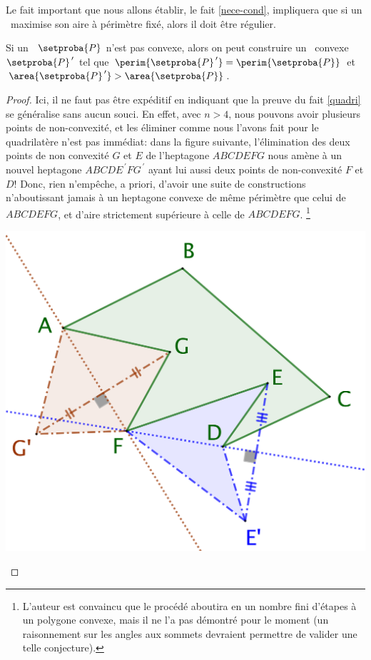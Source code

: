 Le fait important que nous allons établir, le fait \ref{nece-cond}, impliquera que si un \ngone\ maximise son aire à périmètre fixé, alors il doit être régulier.




\begin{fact} \label{conv-poly}
	Si un \ngone\ $\setproba{P}$ n'est pas convexe, alors on peut construire un \ngone\ convexe $\setproba{P}^{\,\prime}$ tel que 
	$\perim{\setproba{P}^{\,\prime}} = \perim{\setproba{P}}$ 
	et 
	$\area{\setproba{P}^{\,\prime}} > \area{\setproba{P}}$.
\end{fact}


\begin{proof}
	Ici, il ne faut pas être expéditif en indiquant que la preuve du fait \ref{quadri} se généralise sans aucun souci.
	En effet, avec $n > 4$, nous pouvons avoir plusieurs points de non-convexité, et les éliminer comme nous l'avons fait pour le quadrilatère n'est pas immédiat:
	dans la figure suivante, l'élimination des deux points de non convexité $G$ et $E$ de l'heptagone $ABCDEFG$ nous amène à un nouvel heptagone $ABCDE^{\,\prime}FG^{\,\prime}$ ayant lui aussi deux points de non-convexité $F$ et $D$!
	Donc, rien n'empêche, a priori, d'avoir une suite de constructions n'aboutissant jamais à un heptagone convexe
	de même périmètre que celui de $ABCDEFG$, et d'aire strictement supérieure à celle de $ABCDEFG$.%
	\footnote{
		L'auteur est convaincu que le procédé aboutira en un nombre fini d'étapes à un polygone convexe, mais il ne l'a pas démontré pour le moment (un raisonnement sur les angles aux sommets devraient permettre de valider une telle conjecture).
	}

	\begin{center}
		\includegraphics[scale=.4]{content/polygon/necessary-cond/non-convex-trap.png}
	\end{center}
	


\end{proof}
